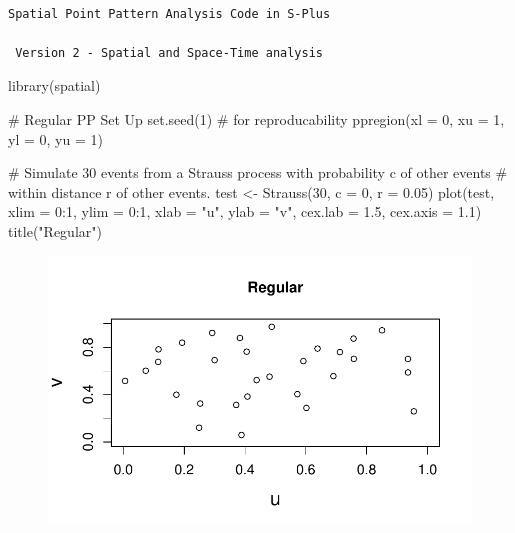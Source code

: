 \documentclass[
  letterpaper,
  DIV=11,
  numbers=noendperiod]{scrartcl}
\newenvironment{Shaded}{\begin{snugshade}}{\end{snugshade}}
\newcommand{\AttributeTok}[1]{\textcolor[rgb]{0.40,0.45,0.13}{#1}}
\newcommand{\CommentTok}[1]{\textcolor[rgb]{0.37,0.37,0.37}{#1}}
\newcommand{\DecValTok}[1]{\textcolor[rgb]{0.68,0.00,0.00}{#1}}
\newcommand{\FloatTok}[1]{\textcolor[rgb]{0.68,0.00,0.00}{#1}}
\newcommand{\FunctionTok}[1]{\textcolor[rgb]{0.28,0.35,0.67}{#1}}
\newcommand{\NormalTok}[1]{\textcolor[rgb]{0.00,0.23,0.31}{#1}}
\newcommand{\OtherTok}[1]{\textcolor[rgb]{0.00,0.23,0.31}{#1}}
\newcommand{\SpecialCharTok}[1]{\textcolor[rgb]{0.37,0.37,0.37}{#1}}
\newcommand{\StringTok}[1]{\textcolor[rgb]{0.13,0.47,0.30}{#1}}
\begin{document}
\begin{verbatim}

Spatial Point Pattern Analysis Code in S-Plus
 
 Version 2 - Spatial and Space-Time analysis
\end{verbatim}

\begin{Shaded}
\begin{Highlighting}[]
\FunctionTok{library}\NormalTok{(spatial)}

\CommentTok{\# Regular PP Set Up}
\FunctionTok{set.seed}\NormalTok{(}\DecValTok{1}\NormalTok{) }\CommentTok{\# for reproducability}
\FunctionTok{ppregion}\NormalTok{(}\AttributeTok{xl =} \DecValTok{0}\NormalTok{, }\AttributeTok{xu =} \DecValTok{1}\NormalTok{, }\AttributeTok{yl =} \DecValTok{0}\NormalTok{, }\AttributeTok{yu =} \DecValTok{1}\NormalTok{)}

\CommentTok{\# Simulate 30 events from a Strauss process with probability c of other events}
\CommentTok{\# within distance r of other events.}
\NormalTok{test }\OtherTok{\textless{}{-}} \FunctionTok{Strauss}\NormalTok{(}\DecValTok{30}\NormalTok{, }\AttributeTok{c =} \DecValTok{0}\NormalTok{, }\AttributeTok{r =} \FloatTok{0.05}\NormalTok{)}
\FunctionTok{plot}\NormalTok{(test, }\AttributeTok{xlim =} \DecValTok{0}\SpecialCharTok{:}\DecValTok{1}\NormalTok{, }\AttributeTok{ylim =} \DecValTok{0}\SpecialCharTok{:}\DecValTok{1}\NormalTok{, }\AttributeTok{xlab =} \StringTok{"u"}\NormalTok{, }\AttributeTok{ylab =} \StringTok{"v"}\NormalTok{, }\AttributeTok{cex.lab =} \FloatTok{1.5}\NormalTok{, }\AttributeTok{cex.axis =} \FloatTok{1.1}\NormalTok{)}
\FunctionTok{title}\NormalTok{(}\StringTok{"Regular"}\NormalTok{)}
\end{Highlighting}
\end{Shaded}

\begin{figure}[H]

{\centering \includegraphics{robby_homework_1---Copy_files/figure-pdf/unnamed-chunk-3-1.pdf}

}

\end{figure}
\end{document}
